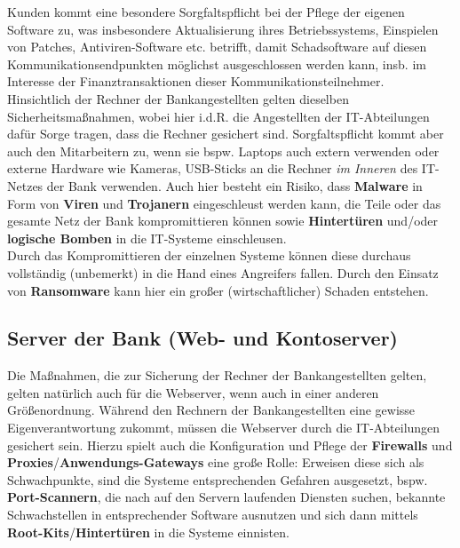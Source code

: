 Kunden kommt eine besondere Sorgfaltspflicht bei der Pflege der eigenen Software zu, was insbesondere Aktualisierung ihres Betriebssystems, Einspielen von Patches, Antiviren-Software {etc.} betrifft, damit Schadsoftware auf diesen Kommunikationsendpunkten möglichst ausgeschlossen werden kann, {insb.} im Interesse der Finanztransaktionen dieser Kommunikationsteilnehmer.\\
Hinsichtlich der Rechner der Bankangestellten gelten dieselben Sicherheitsmaßnahmen, wobei hier i.d.R. die Angestellten der IT-Abteilungen dafür Sorge tragen, dass die Rechner gesichert sind. Sorgfaltspflicht kommt aber auch den Mitarbeitern zu, wenn sie {bspw.} Laptops auch extern verwenden oder externe Hardware wie Kameras, USB-Sticks an die Rechner \textit{im Inneren} des IT-Netzes der Bank verwenden.
Auch hier besteht ein Risiko, dass \textbf{Malware} in Form von \textbf{Viren} und \textbf{Trojanern} eingeschleust werden kann, die Teile oder das gesamte Netz der Bank kompromittieren können sowie \textbf{Hintertüren} und/oder \textbf{logische Bomben} in die IT-Systeme einschleusen.\\
Durch das Kompromittieren der einzelnen Systeme können diese durchaus vollständig (unbemerkt) in die Hand eines Angreifers fallen.
Durch den Einsatz von \textbf{Ransomware} kann hier ein großer (wirtschaftlicher) Schaden entstehen.

\subsection{Server der Bank (Web- und Kontoserver)}
Die Maßnahmen, die zur Sicherung der Rechner der Bankangestellten gelten, gelten natürlich auch für die Webserver, wenn auch in einer anderen Größenordnung. Während den Rechnern der Bankangestellten eine gewisse Eigenverantwortung zukommt, müssen die Webserver durch die IT-Abteilungen gesichert sein. Hierzu spielt auch die Konfiguration und Pflege der \textbf{Firewalls} und \textbf{Proxies}/\textbf{Anwendungs-Gateways} eine große Rolle: Erweisen diese sich als Schwachpunkte, sind die Systeme entsprechenden Gefahren ausgesetzt, bspw. \textbf{Port-Scannern}, die nach auf den Servern laufenden Diensten suchen, bekannte Schwachstellen in entsprechender Software ausnutzen und sich dann mittels \textbf{Root-Kits}/\textbf{Hintertüren} in die Systeme einnisten.

